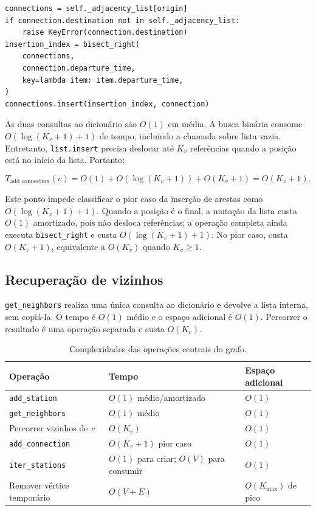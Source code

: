 \documentclass[11pt,a4paper]{article}
\begin{document}
\begin{lstlisting}[caption={Inserção por horário em \texttt{backend/app/graph.py:20--29}.}]
connections = self._adjacency_list[origin]
if connection.destination not in self._adjacency_list:
    raise KeyError(connection.destination)
insertion_index = bisect_right(
    connections,
    connection.departure_time,
    key=lambda item: item.departure_time,
)
connections.insert(insertion_index, connection)
\end{lstlisting}

As duas consultas ao dicionário são $O(1)$ em média. A busca binária consome
$O(\log(K_v+1)+1)$ de tempo, incluindo a chamada sobre lista vazia.
Entretanto, \texttt{list.insert} precisa deslocar
até $K_v$ referências quando a posição está no início da lista. Portanto:

\[
T_{\text{add\_connection}}(v)
=O(1)+O(\log(K_v+1))+O(K_v+1)=O(K_v+1).
\]

Este ponto impede classificar o pior caso da inserção de arestas como
$O(\log(K_v+1)+1)$. Quando a posição é o final, a mutação da lista custa
$O(1)$ amortizado, pois não desloca referências; a operação completa ainda
executa \texttt{bisect\_right} e custa $O(\log(K_v+1)+1)$.
No pior caso, custa $O(K_v+1)$, equivalente a $O(K_v)$ quando $K_v\ge 1$.

\subsection{Recuperação de vizinhos}

\texttt{get\_neighbors} realiza uma única consulta ao dicionário e devolve a
lista interna, sem copiá-la. O tempo é $O(1)$ médio e o espaço adicional é
$O(1)$. Percorrer o resultado é uma operação separada e custa $O(K_v)$.

\begin{table}[ht]
\centering
\caption{Complexidades das operações centrais do grafo.}
\begin{tabularx}{\textwidth}{@{}lXX@{}}
\toprule
Operação & Tempo & Espaço adicional \\
\midrule
\texttt{add\_station} & $O(1)$ médio/amortizado & $O(1)$ \\
\texttt{get\_neighbors} & $O(1)$ médio & $O(1)$ \\
Percorrer vizinhos de $v$ & $O(K_v)$ & $O(1)$ \\
\texttt{add\_connection} & $O(K_v+1)$ pior caso & $O(1)$ \\
\texttt{iter\_stations} & $O(1)$ para criar; $O(V)$ para consumir & $O(1)$ \\
Remover vértice temporário & $O(V+E)$ & $O(K_{\max})$ de pico \\
\bottomrule
\end{tabularx}
\end{table}
\end{document}
